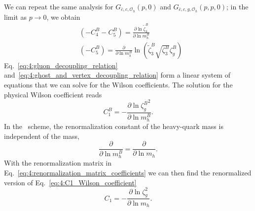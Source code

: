 We can repeat the same analysis for $G_{\bar{c}, c, \mathcal{O}_h}(p, 0)$ and $G_{\bar{c}, c, g, \mathcal{O}_h} (p, p, 0)$; in the limit as $p \rightarrow 0$, we obtain
\begin{equation}
\begin{split}
&\left( - C_4^B - C_5^B \right) = \frac{\partial \ln \tilde{\zeta}_3^B}{\partial \ln m_h^B} \\
&\left( - C_5^B \right) = \frac{\partial}{\partial \ln m_h^B} \ln\!\left(\tilde{\zeta}_3^B \sqrt{\zeta_3^B} \zeta_g^B \right)
\end{split}
\label{eq:4:ghost_and_vertex_decoupling_relation}
\end{equation}
Eq.~\eqref{eq:4:gluon_decoupling_relation} and\ \eqref{eq:4:ghost_and_vertex_decoupling_relation} form a linear system of equations that we can solve for the Wilson coefficients. The solution for the physical Wilson coefficient reads
\begin{equation}
C_1^B = - \frac{\partial \ln {\zeta_g^{B}}^2}{\partial \ln m_h^B}.
\label{eq:4:C1_Wilson_coefficient}
\end{equation}
In the \MS\ scheme, the renormalization constant of the heavy-quark mass is independent of the mass, \ie
\begin{equation}
\frac{\partial}{\partial \ln m_h^B} = \frac{\partial}{\partial \ln m_h}.
\end{equation}
With the renormalization matrix in Eq.~\eqref{eq:4:renormalization_matrix_coefficients} we can then find the renormalized version of Eq.~\eqref{eq:4:C1_Wilson_coefficient}
\begin{equation}
C_1 = - \frac{\partial \ln \zeta_g^2}{\partial \ln m_h}.
\end{equation}


